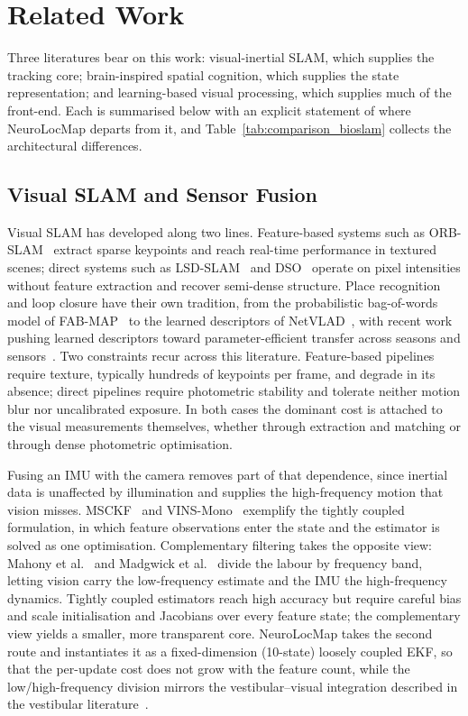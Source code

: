 \section{Related Work}
\label{sec:related}

Three literatures bear on this work: visual-inertial SLAM, which supplies the tracking core; brain-inspired spatial cognition, which supplies the state representation; and learning-based visual processing, which supplies much of the front-end. Each is summarised below with an explicit statement of where NeuroLocMap departs from it, and Table~\ref{tab:comparison_bioslam} collects the architectural differences.

\subsection{Visual SLAM and Sensor Fusion}
\label{sec:related_slam}

Visual SLAM has developed along two lines. Feature-based systems such as ORB-SLAM~\cite{mur2015orb} extract sparse keypoints and reach real-time performance in textured scenes; direct systems such as LSD-SLAM~\cite{engel2014lsd} and DSO~\cite{engel2018direct} operate on pixel intensities without feature extraction and recover semi-dense structure. Place recognition and loop closure have their own tradition, from the probabilistic bag-of-words model of FAB-MAP~\cite{Cummins2008} to the learned descriptors of NetVLAD~\cite{Arandjelovic2016}, with recent work pushing learned descriptors toward parameter-efficient transfer across seasons and sensors~\cite{wu2026pevpr}. Two constraints recur across this literature. Feature-based pipelines require texture, typically hundreds of keypoints per frame, and degrade in its absence; direct pipelines require photometric stability and tolerate neither motion blur nor uncalibrated exposure. In both cases the dominant cost is attached to the visual measurements themselves, whether through extraction and matching or through dense photometric optimisation.

Fusing an IMU with the camera removes part of that dependence, since inertial data is unaffected by illumination and supplies the high-frequency motion that vision misses. MSCKF~\cite{Mourikis2007} and VINS-Mono~\cite{Qin2018} exemplify the tightly coupled formulation, in which feature observations enter the state and the estimator is solved as one optimisation. Complementary filtering takes the opposite view: Mahony et al.~\cite{Mahony2008} and Madgwick et al.~\cite{Madgwick2011} divide the labour by frequency band, letting vision carry the low-frequency estimate and the IMU the high-frequency dynamics. Tightly coupled estimators reach high accuracy but require careful bias and scale initialisation and Jacobians over every feature state; the complementary view yields a smaller, more transparent core. NeuroLocMap takes the second route and instantiates it as a fixed-dimension (10-state) loosely coupled EKF, so that the per-update cost does not grow with the feature count, while the low/high-frequency division mirrors the vestibular--visual integration described in the vestibular literature~\cite{Angelaki2004,Cullen2012}.

